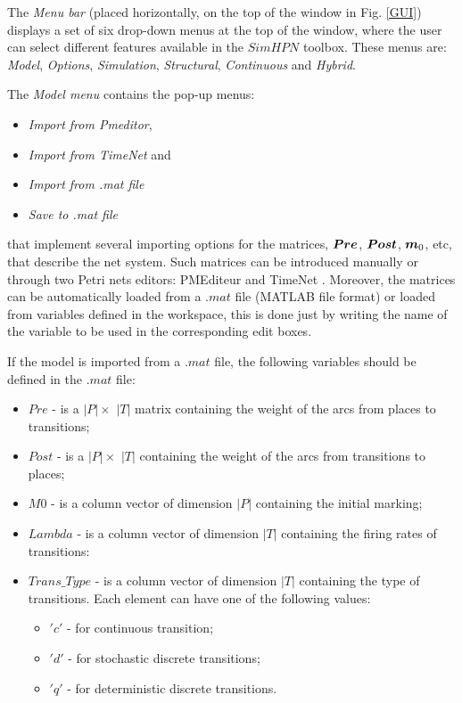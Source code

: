 The \emph{Menu bar} (placed horizontally, on the top of the window in Fig. \ref{GUI}) displays a set of six drop-down menus at the top of the window, where the user can select different features available in the $SimHPN$ toolbox. These menus are: \emph{Model}, \emph{Options}, \emph{Simulation}, \emph{Structural}, \emph{Continuous} and \emph{Hybrid}.

The {\color{blue}\emph{Model menu}} contains the pop-up menus:
\begin{itemize}
\item \emph{Import from Pmeditor}, 
\item \emph{Import from TimeNet} and 
\item \emph{Import from .mat file} 
\item \emph{Save to .mat file}
\end{itemize}
that implement several importing options for the matrices, $\b{Pre}$, $\b{Post}$, $\mo$, etc, that describe the net system. Such matrices can be introduced manually or through two Petri nets editors: PMEditeur and TimeNet \cite{IPZiKn95}.  Moreover, the matrices can be automatically loaded from a $.mat$ file (MATLAB file format) or loaded from variables defined in the workspace, this is done just by writing the name of the variable to be used in the corresponding edit boxes. 

If the model is imported from a $.mat$ file, the following variables should be defined in the $.mat$ file:

\begin{itemize}
\item $Pre$ - is a $|P| \times$ $|T|$ matrix containing the weight of the arcs from places to transitions;
\item $Post$ - is a $|P| \times$ $|T|$   containing the weight of the arcs from transitions to places;
\item $M0$ - is a column vector of dimension $|P|$ containing the initial marking;
\item $Lambda$ - is a column vector of dimension $|T|$ containing the firing rates of transitions:
\item $Trans\_Type$ - is a column vector of dimension $|T|$ containing the type of transitions. Each element can have one of the following values:
\begin{itemize}
\item $'c'$ - for continuous transition;
\item $'d'$ - for stochastic discrete transitions;
\item $'q'$ -  for deterministic  discrete transitions.
\end{itemize}
\end{itemize}


